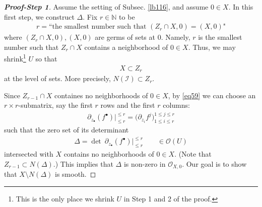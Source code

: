 \documentclass[12pt,b5paper,notitlepage]{report}
\theoremstyle{definition}
\theoremstyle{plain}
\newcommand{\mc}{\mathcal}
\newcommand{\scr}{\mathscr}
\newcommand{\blt}{\bullet}
\newcommand{\Nbb}{\mathbb N}
\numberwithin{equation}{section}
\begin{document}
\begin{proof}[\textbf{Proof-Step 1}]
Assume the setting of Subsec. \ref{lb116}, and assume $0\in X$. In this first step, we construct $\varDelta$.  Fix $r\in\Nbb$ to be 
\begin{align*}
r=\text{``the smallest number such that $(Z_r\cap X,0)=(X,0)$"}
\end{align*}
where $(Z_r\cap X,0),(X,0)$ are germs of sets at $0$. Namely, $r$ is the smallest number such that $Z_r\cap X$ contains a neighborhood of $0\in X$. Thus, we may shrink\footnote{This is the only place we shrink $U$ in Step 1 and 2 of the proof.} $U$  so that
\begin{align*}
X\subset Z_r
\end{align*}
at the level of sets. More precisely, $N(\mc I)\subset Z_r$.



Since $Z_{r-1}\cap X$ containes no neighborhoods of $0\in X$, by \eqref{eq59} we can choose an $r\times r$-submatrix, say the first $r$ rows and the first $r$ columns:
\begin{align*}
\partial_{z_\blt}(f^\blt)\Big|_{\leq r}^{\leq r}=\Big(\partial_{z_i}f^j\Big)_{1\leq i\leq r}^{1\leq j\leq r}
\end{align*}
such that the zero set of its determinant
\begin{align*}
\varDelta=\det~\partial_{z_\blt}(f^\blt)\Big|_{\leq r}^{\leq r}\qquad\in\scr O(U)
\end{align*}
intersected with $X$ contains no neighborhoods of $0\in X$. (Note that $Z_{r-1}\subset N(\varDelta)$.) This implies that $\varDelta$ is non-zero in $\scr O_{X,0}$. Our goal is to show that $X\setminus N(\varDelta)$ is smooth.
\end{proof}
\end{document}
